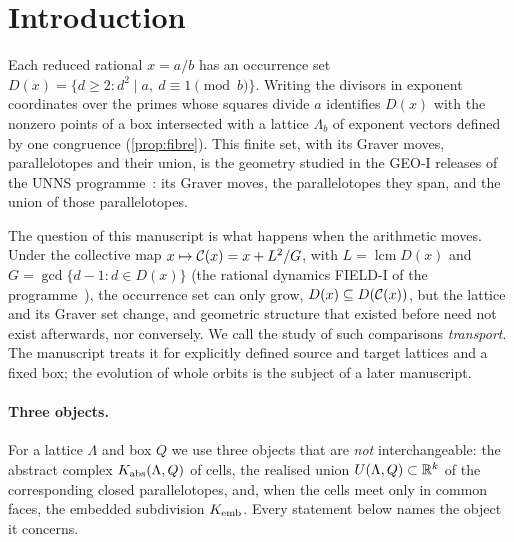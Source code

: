 \section{Introduction}\label{sec:intro}
Each reduced rational $x=a/b$ has an occurrence set $D(x)=\{d\ge2: d^2\mid a,\ d\equiv1 \pmod b\}$. Writing the divisors in exponent coordinates over the primes whose squares divide $a$ identifies $D(x)$ with the nonzero points of a box intersected with a lattice $\Lambda_b$ of exponent vectors defined by one congruence (\cref{prop:fibre}). This finite set, with its Graver moves, parallelotopes and their union, is the geometry studied in the GEO-I releases of the UNNS programme~\cite{GEOI}: its Graver moves, the parallelotopes they span, and the union of those parallelotopes.

The question of this manuscript is what happens when the arithmetic moves. Under the collective map $x\mapsto\mathcal C(x)=x+L^2/G$, with $L=\operatorname{lcm}D(x)$ and $G=\gcd\{d-1:d\in D(x)\}$ (the rational dynamics FIELD-I of the programme~\cite{FoundII}), the occurrence set can only grow, $D(x)\subseteq D(\mathcal C(x))$, but the lattice and its Graver set change, and geometric structure that existed before need not exist afterwards, nor conversely. We call the study of such comparisons \emph{transport}. The manuscript treats it for explicitly defined source and target lattices and a fixed box; the evolution of whole orbits is the subject of a later manuscript.

\paragraph{Three objects.} For a lattice $\Lambda$ and box $Q$ we use three objects that are \emph{not} interchangeable: the abstract complex $K_{\mathrm{abs}}(\Lambda,Q)$ of cells, the realised union $U(\Lambda,Q)\subset\mathbb R^k$ of the corresponding closed parallelotopes, and, when the cells meet only in common faces, the embedded subdivision $K_{\mathrm{emb}}$. Every statement below names the object it concerns.

